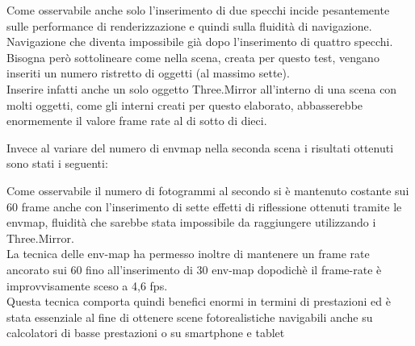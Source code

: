 Come osservabile anche solo l’inserimento di due specchi incide pesantemente sulle performance di renderizzazione e quindi sulla fluidità di navigazione.
\\
Navigazione che diventa impossibile già dopo l’inserimento di quattro specchi.
Bisogna però sottolineare come nella scena, creata per questo test, vengano inseriti un numero ristretto di oggetti (al massimo sette).
\\
Inserire infatti anche un solo oggetto Three.Mirror all’interno di una scena con molti oggetti, come gli interni creati per questo elaborato, abbasserebbe enormemente il valore frame rate al di sotto di dieci.


Invece al variare del numero di envmap nella seconda scena i risultati ottenuti sono stati i seguenti:



Come osservabile il numero di fotogrammi al secondo si è mantenuto costante sui 60 frame anche con l’inserimento di sette effetti di riflessione ottenuti tramite le envmap, fluidità che sarebbe stata impossibile da raggiungere utilizzando i Three.Mirror.
\\
La tecnica delle env-map ha permesso inoltre di mantenere un frame rate ancorato sui 60 fino all’inserimento di 30 env-map dopodichè il frame-rate è improvvisamente sceso a 4,6 fps.
\\
Questa tecnica comporta quindi benefici enormi in termini di prestazioni ed è stata essenziale al fine di ottenere scene fotorealistiche navigabili anche su calcolatori di basse prestazioni o su smartphone e tablet
